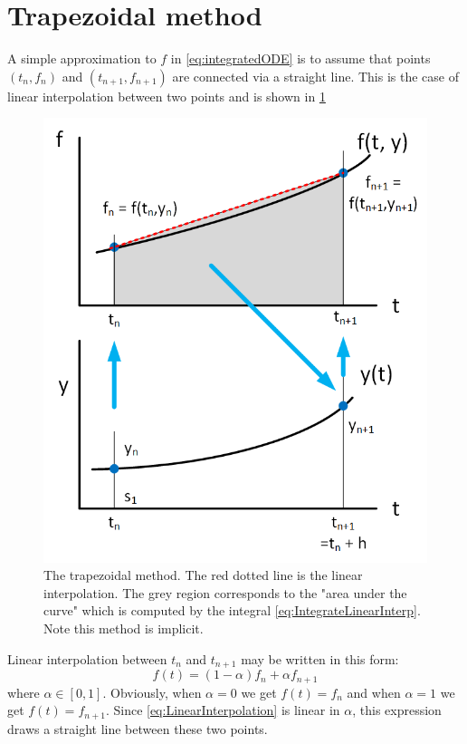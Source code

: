 \documentclass[hidelinks,notitlepage]{book}
\begin{document}
\section{Trapezoidal method}
A simple approximation to $f$ in \cref{eq:integratedODE} is to assume that points $(t_n, f_n)$ and $(t_{n+1}, f_{n+1})$ are connected via a straight line.  This is the case of linear interpolation between two points and is shown in \cref{fig:TrapezoidalMethod}
\begin{figure}[h!]
	\centering
	\includegraphics[width=0.6\columnwidth]{TrapezoidalMethod.png}
	\caption{The trapezoidal method.  The red dotted line is the linear interpolation.  The grey region corresponds to the "area under the curve" which is computed by the integral \cref{eq:IntegrateLinearInterp}.  Note this method is implicit.}
	\label{fig:TrapezoidalMethod}
\end{figure}
Linear interpolation between $t_n$ and $t_{n+1}$ may be written in this form:
\begin{equation}
\label{eq:LinearInterpolation}
f(t) = (1-\alpha) f_n + \alpha f_{n+1}
\end{equation}
where $\alpha \in [0, 1]$.  Obviously, when $\alpha = 0$ we get $f(t) = f_n$ and when $\alpha = 1$ we get $f(t) = f_{n+1}$.  Since \cref{eq:LinearInterpolation} is linear in $\alpha$, this expression draws a straight line between these two points.
\end{document}
